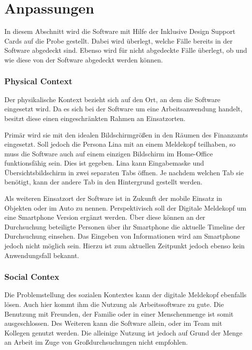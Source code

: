 \section{Anpassungen}

In diesem Abschnitt wird die Software mit Hilfe der Inklusive Design Support Cards \cite{ITToolkit} auf die Probe gestellt.
Dabei wird überlegt, welche Fälle bereits in der Software abgedeckt sind.
Ebenso wird für nicht abgedeckte Fälle überlegt, ob und wie diese von der Software abgedeckt werden können.

\subsubsection{Physical Context}

Der physikalische Kontext bezieht sich auf den Ort, an dem die Software eingesetzt wird.
Da es sich bei der Software um eine Arbeitsanwendung handelt, besitzt diese einen eingeschränkten Rahmen an Einsatzorten.

Primär wird sie mit den idealen Bildschirmgrößen in den Räumen des Finanzamts eingesetzt.
Soll jedoch die Persona Lina mit an einem Meldekopf teilhaben, so muss die Software auch auf einem einzigen Bildschirm im Home-Office funktionsfähig sein.
Dies ist gegeben.
Lina kann Eingabemaske und Übersichtsbildschirm in zwei separaten Tabs öffnen. 
Je nachdem welchen Tab sie benötigt, kann der andere Tab in den Hintergrund gestellt werden.

Als weiteren Einsatzort der Software ist in Zukunft der mobile Einsatz in Objekten oder im Auto zu nennen.
Perspektivisch soll der Digitale Meldekopf um eine Smartphone Version ergänzt werden.
Über diese können an der Durchsuchung beteiligte Personen über ihr Smartphone die aktuelle Timeline der Durchsuchung einsehen.
Das Eingeben von Informationen wird am Smartphone jedoch nicht möglich sein.
Hierzu ist zum aktuellen Zeitpunkt jedoch ebenso kein Anwendungsfall bekannt.

\subsubsection{Social Contex}

Die Problemstellung des sozialen Kontextes kann der digitale Meldekopf ebenfalls lösen.
Auch hier kommt ihm die Nutzung als Arbeitssoftware zu gute.
Die Benutzung mit Freunden, der Familie oder in einer Menschenmenge ist somit ausgeschlossen.
Des Weiteren kann die Software allein, oder im Team mit Kollegen genutzt werden.
Die alleinige Nutzung ist jedoch auf Grund der Menge an Arbeit im Zuge von Großdurchsuchungen nicht empfohlen.

